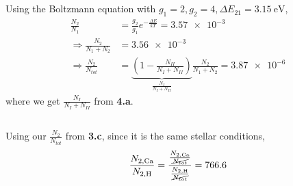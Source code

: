 \documentclass{article}
\begin{document}
\subsection{}

Using the Boltzmann equation with \(g_1 = 2, g_2 = 4, \Delta E_{21} = \SI{3.15}{\electronvolt}\),
\begin{align}
    \frac{N_2}{N_1} &= \frac{g_2}{g_1} e^{-\frac{\Delta E}{kT}} = \num{3.57e-3} \\
    \Rightarrow \frac{N_2}{N_1 + N_2} &= \num{3.56e-3} \\
    \Rightarrow \frac{N_2}{N_{tot}} &= \underbrace{\left(1 - \frac{N_{II}}{N_I + N_{II}}\right)}_{\frac{N_I}{N_I + N_{II}}} \frac{N_2}{N_1 + N_2} = \num{3.87e-6}
\end{align}
where we get \(\frac{N_I}{N_I + N_{II}}\) from \textbf{4.a}.

\subsection{}

Using our \(\frac{N_2}{N_{tot}}\) from \textbf{3.c}, since it is the same stellar conditions,
\begin{equation}
    \frac{N_{2, \ce{Ca}}}{N_{2, \ce{H}}} = \frac{\frac{N_{2, \ce{Ca}}}{\cancel{N_{tot}}}}{\frac{N_{2, \ce{H}}}{\cancel{N_{tot}}}} = \num{766.6}
\end{equation}
\end{document}
